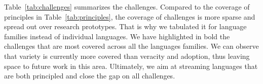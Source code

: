 Table~\ref{tab:challenges} summarizes the challenges.  Compared to the
coverage of principles in Table~\ref{tab:principles}, the coverage of
challenges is more sparse and spread out over research prototypes.
That is why we tabulated it for language families instead of
individual languages. 
We have highlighted in bold the challenges that are most covered across all
the languages families. We can observe that variety is currently more
covered than veracity and adoption, thus leaving space to future work in
this area. 
Ultimately, we aim at streaming languages that are
both principled and close the gap on all challenges.
